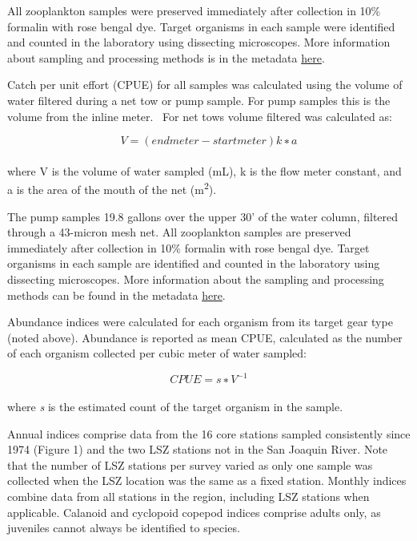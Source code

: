 \documentclass[
  letterpaper,
]{article}
\begin{document}
All zooplankton samples were preserved immediately after collection in
10\% formalin with rose bengal dye. Target organisms in each sample were
identified and counted in the laboratory using dissecting microscopes.
More information about sampling and processing methods is in the
metadata
\href{https://filelib.wildlife.ca.gov/Public/IEP_Zooplankton/}{here}.

Catch per unit effort (CPUE) for all samples was calculated using the
volume of water filtered during a net tow or pump sample. For pump
samples this is the volume from the inline meter.~ For net tows volume
filtered was calculated as:

\[V=(endmeter−startmeter)k∗a\]\\
where V is the volume of water sampled (mL), k is the flow meter
constant, and a is the area of the mouth of the net
(m\textsuperscript{2}).

The pump samples 19.8 gallons over the upper 30' of the water column,
filtered through a 43-micron mesh net. All zooplankton samples are
preserved immediately after collection in 10\% formalin with rose bengal
dye. Target organisms in each sample are identified and counted in the
laboratory using dissecting microscopes. More information about the
sampling and processing methods can be found in the metadata
\href{https://filelib.wildlife.ca.gov/Public/IEP_Zooplankton/}{here}.

Abundance indices were calculated for each organism from its target gear
type (noted above). Abundance is reported as mean CPUE, calculated as
the number of each organism collected per cubic meter of water sampled:

\[CPUE=s∗V^{−1}\]\\
where \emph{s} is the estimated count of the target organism in the
sample.

Annual indices comprise data from the 16 core stations sampled
consistently since 1974 (Figure 1) and the two LSZ stations not in the
San Joaquin River. Note that the number of LSZ stations per survey
varied as only one sample was collected when the LSZ location was the
same as a fixed station. Monthly indices combine data from all stations
in the region, including LSZ stations when applicable. Calanoid and
cyclopoid copepod indices comprise adults only, as juveniles cannot
always be identified to species.
\end{document}
